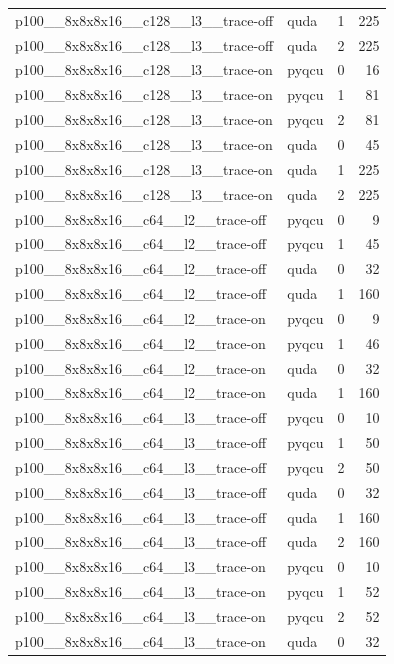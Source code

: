 \begin{table}[htbp]
\begin{tabular}{@{}llrr@{}}
p100\_\_8x8x8x16\_\_c128\_\_l3\_\_trace-off & quda & 1 & 225 \\
p100\_\_8x8x8x16\_\_c128\_\_l3\_\_trace-off & quda & 2 & 225 \\
p100\_\_8x8x8x16\_\_c128\_\_l3\_\_trace-on & pyqcu & 0 & 16 \\
p100\_\_8x8x8x16\_\_c128\_\_l3\_\_trace-on & pyqcu & 1 & 81 \\
p100\_\_8x8x8x16\_\_c128\_\_l3\_\_trace-on & pyqcu & 2 & 81 \\
p100\_\_8x8x8x16\_\_c128\_\_l3\_\_trace-on & quda & 0 & 45 \\
p100\_\_8x8x8x16\_\_c128\_\_l3\_\_trace-on & quda & 1 & 225 \\
p100\_\_8x8x8x16\_\_c128\_\_l3\_\_trace-on & quda & 2 & 225 \\
p100\_\_8x8x8x16\_\_c64\_\_l2\_\_trace-off & pyqcu & 0 & 9 \\
p100\_\_8x8x8x16\_\_c64\_\_l2\_\_trace-off & pyqcu & 1 & 45 \\
p100\_\_8x8x8x16\_\_c64\_\_l2\_\_trace-off & quda & 0 & 32 \\
p100\_\_8x8x8x16\_\_c64\_\_l2\_\_trace-off & quda & 1 & 160 \\
p100\_\_8x8x8x16\_\_c64\_\_l2\_\_trace-on & pyqcu & 0 & 9 \\
p100\_\_8x8x8x16\_\_c64\_\_l2\_\_trace-on & pyqcu & 1 & 46 \\
p100\_\_8x8x8x16\_\_c64\_\_l2\_\_trace-on & quda & 0 & 32 \\
p100\_\_8x8x8x16\_\_c64\_\_l2\_\_trace-on & quda & 1 & 160 \\
p100\_\_8x8x8x16\_\_c64\_\_l3\_\_trace-off & pyqcu & 0 & 10 \\
p100\_\_8x8x8x16\_\_c64\_\_l3\_\_trace-off & pyqcu & 1 & 50 \\
p100\_\_8x8x8x16\_\_c64\_\_l3\_\_trace-off & pyqcu & 2 & 50 \\
p100\_\_8x8x8x16\_\_c64\_\_l3\_\_trace-off & quda & 0 & 32 \\
p100\_\_8x8x8x16\_\_c64\_\_l3\_\_trace-off & quda & 1 & 160 \\
p100\_\_8x8x8x16\_\_c64\_\_l3\_\_trace-off & quda & 2 & 160 \\
p100\_\_8x8x8x16\_\_c64\_\_l3\_\_trace-on & pyqcu & 0 & 10 \\
p100\_\_8x8x8x16\_\_c64\_\_l3\_\_trace-on & pyqcu & 1 & 52 \\
p100\_\_8x8x8x16\_\_c64\_\_l3\_\_trace-on & pyqcu & 2 & 52 \\
p100\_\_8x8x8x16\_\_c64\_\_l3\_\_trace-on & quda & 0 & 32 \\

\end{tabular}
\end{table}
